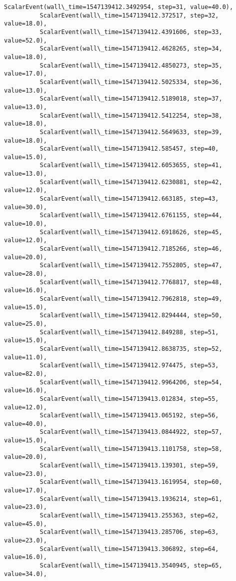 \documentclass[11pt]{article}
\begin{document}
\begin{Verbatim}[commandchars=\\\{\}]
          ScalarEvent(wall\_time=1547139412.3492954, step=31, value=40.0),
          ScalarEvent(wall\_time=1547139412.372517, step=32, value=18.0),
          ScalarEvent(wall\_time=1547139412.4391606, step=33, value=52.0),
          ScalarEvent(wall\_time=1547139412.4628265, step=34, value=18.0),
          ScalarEvent(wall\_time=1547139412.4850273, step=35, value=17.0),
          ScalarEvent(wall\_time=1547139412.5025334, step=36, value=13.0),
          ScalarEvent(wall\_time=1547139412.5189018, step=37, value=13.0),
          ScalarEvent(wall\_time=1547139412.5412254, step=38, value=18.0),
          ScalarEvent(wall\_time=1547139412.5649633, step=39, value=18.0),
          ScalarEvent(wall\_time=1547139412.585457, step=40, value=15.0),
          ScalarEvent(wall\_time=1547139412.6053655, step=41, value=13.0),
          ScalarEvent(wall\_time=1547139412.6230881, step=42, value=12.0),
          ScalarEvent(wall\_time=1547139412.663185, step=43, value=30.0),
          ScalarEvent(wall\_time=1547139412.6761155, step=44, value=10.0),
          ScalarEvent(wall\_time=1547139412.6918626, step=45, value=12.0),
          ScalarEvent(wall\_time=1547139412.7185266, step=46, value=20.0),
          ScalarEvent(wall\_time=1547139412.7552805, step=47, value=28.0),
          ScalarEvent(wall\_time=1547139412.7768817, step=48, value=16.0),
          ScalarEvent(wall\_time=1547139412.7962818, step=49, value=15.0),
          ScalarEvent(wall\_time=1547139412.8294444, step=50, value=25.0),
          ScalarEvent(wall\_time=1547139412.849288, step=51, value=15.0),
          ScalarEvent(wall\_time=1547139412.8638735, step=52, value=11.0),
          ScalarEvent(wall\_time=1547139412.974475, step=53, value=82.0),
          ScalarEvent(wall\_time=1547139412.9964206, step=54, value=16.0),
          ScalarEvent(wall\_time=1547139413.012834, step=55, value=12.0),
          ScalarEvent(wall\_time=1547139413.065192, step=56, value=40.0),
          ScalarEvent(wall\_time=1547139413.0844922, step=57, value=15.0),
          ScalarEvent(wall\_time=1547139413.1101758, step=58, value=20.0),
          ScalarEvent(wall\_time=1547139413.139301, step=59, value=23.0),
          ScalarEvent(wall\_time=1547139413.1619954, step=60, value=17.0),
          ScalarEvent(wall\_time=1547139413.1936214, step=61, value=23.0),
          ScalarEvent(wall\_time=1547139413.255363, step=62, value=45.0),
          ScalarEvent(wall\_time=1547139413.285706, step=63, value=23.0),
          ScalarEvent(wall\_time=1547139413.306892, step=64, value=16.0),
          ScalarEvent(wall\_time=1547139413.3540945, step=65, value=34.0),

\end{Verbatim}
\end{document}
